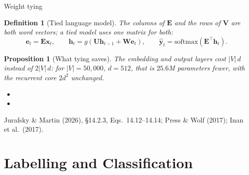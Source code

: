 \documentclass[aspectratio=169, 11pt]{beamer}
\newtheorem{propx}[theorem]{Proposition}
\newtheorem{defx}[theorem]{Definition}
\newcommand{\srcline}[1]{%
  \par\vspace{0.25em}%
  {\scriptsize\color{mcMuted}\hfill #1\par}}
\newcommand{\src}[3]{}      %
\begin{document}
\begin{frame}{Weight tying}
  \src{jurafsky_slp3}{equation}{14.12-14.14}
  \src{jurafsky_slp3}{section}{14.2.3}
  \src{press2017}{section}{3}
  \src{inan2017}{section}{4}
  \vspace{-0.45em}
  \begin{defx}[Tied language model]\label{th:tying}
    \small
    The columns of $\mathbf{E}$ and the rows of $\mathbf{V}$ are both word
    vectors; a \alert{tied} model uses one matrix for both:
    \[
      \mathbf{e}_t = \mathbf{E}\mathbf{x}_t, \qquad
      \mathbf{h}_t = g(\mathbf{U}\mathbf{h}_{t-1} + \mathbf{W}\mathbf{e}_t), \qquad
      \hat{\mathbf{y}}_t = \mathrm{softmax}(\mathbf{E}^{\top}\mathbf{h}_t).
    \]
  \end{defx}
  \vspace{-0.4em}
  \begin{propx}[What tying saves]\label{th:tyingcount}
    \small
    The embedding and output layers cost $|V|\,d$ instead of $2|V|\,d$:
    for $|V| = 50{,}000$, $d = 512$, that is $25.6$M parameters fewer,
    with the recurrent core $2d^2$ unchanged.
  \end{propx}
  \vspace{-0.1em}
  {\footnotesize
  \begin{itemize}\itemsep0.1em
    \item {}
    \item {}
  \end{itemize}}
  \vspace{-0.3em}
  \srcline{Jurafsky \& Martin (2026), \S14.2.3, Eqs.~14.12--14.14; Press \& Wolf (2017); Inan et al.\ (2017).}
\end{frame}

\section{Labelling and Classification}
\end{document}
